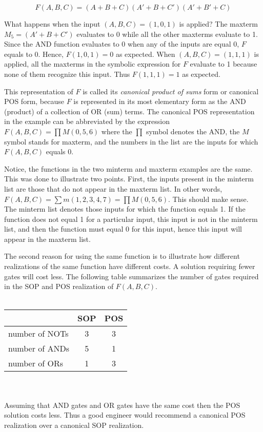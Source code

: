 $$F(A,B,C) =  (A+B+C)(A'+B+C')(A'+B'+C)$$

What happens when the input $(A,B,C)=(1,0,1)$ is applied?
The maxterm $M_5=(A'+B+C')$ evaluates to 0 while all the other maxterms
evaluate to 1.  Since the AND function evaluates to 0 when any of
the inputs are equal 0, $F$ equals to 0. Hence, $F(1,0,1)=0$ as
expected.  When $(A,B,C)=(1,1,1)$ is applied, all the
maxterms in the symbolic expression for $F$ evaluate to 1 because
none of them recognize this input.  Thus $F(1,1,1)=1$ as expected.

This representation of $F$ is called its \textit{canonical product of sums}
form or canonical POS form, because $F$ is represented in its most
elementary form as the AND (product) of a collection of OR (sum) terms.
The canonical POS representation in the example can be abbreviated by
the expression $F(A,B,C) = \prod M(0,5,6)$  where the $\prod$
symbol denotes the AND, the $M$ symbol stands for maxterm, and the
numbers in the list are the inputs for which $F(A,B,C)$ equals 0.

Notice, the functions in the two minterm and maxterm examples are the
same.  This was done to illustrate two points.  First, the inputs
present in the minterm list are those that do not appear in the maxterm
list.  In other words, $F(A,B,C) = \sum m(1,2,3,4,7) = \prod M (0,5,6)$.
This should make sense. The minterm list denotes those inputs for
which the function equals 1.  If the function does not equal 1 for
a particular input, this input is not in the minterm list, and then the
function must equal 0 for this input, hence this input will appear
in the maxterm list.

The second reason for using the same function is to illustrate
how different realizations of the same function have different costs.
A solution requiring fewer gates
will cost less.  The following table summarizes the number of gates
required in the SOP and POS realization of $F(A,B,C)$.
\\ \\
\begin{tabular}[ht]{l|c|c}
& SOP     & POS    \\ \hline
number of NOTs & 3    & 3    \\ \hline
number of ANDs & 5    & 1    \\ \hline
number of ORs  & 1    & 3    \\
\end{tabular}
\\ \\
Assuming that AND gates and OR gates have the same cost then the POS
solution costs less.  Thus a good engineer would recommend a
canonical POS realization over a canonical SOP realization.

